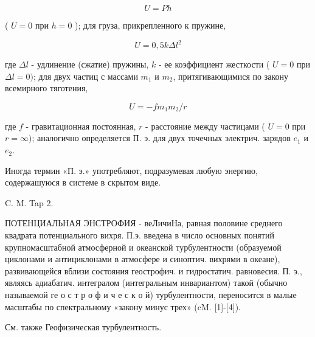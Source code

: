 \documentclass[10pt]{article}
\begin{document}
\[

U=P h

\]



( $U=0$ при $h=0$ ); для груза, прикрепленного к пружине,



\[

U=0,5 k \Delta l^{2}

\]



где $\Delta l$ - удлинение (сжатие) пружины, $k$ - ее коэффициент жесткости ( $U=0$ при $\Delta l=0)$; для двух частиц с массами $m_{1}$ и $m_{2}$, притягивающимися по закону всемирного тяготения,



\[

U=-f m_{1} m_{2} / r

\]



где $f$ - гравитационная постоянная, $r$ - расстояние между частицами ( $U=0$ при $r=\infty)$; аналогично определяется П. э. для двух точечных электрич. зарядов $e_{1}$ и $e_{2}$.



Иногда термин «П. э.» употребляют, подразумевая любую энергию, содержашуюся в системе в скрытом виде.



C. M. Tap 2.



ПОТЕНЦИАЛЬНАЯ ЭНСТРОФИЯ - веЛичиНа, равная половине среднего квадрата потенциального вихря. П.э. введена в число основных понятий крупномасштабной атмосферной и океанской турбулентности (образуемой циклонами и антициклонами в атмосфере и синоптич. вихрями в океане), развивающейся вблизи состояния геострофич. и гидростатич. равновесия. П. э., являясь адиабатич. интегралом (интегральным инвариантом) такой (обычно называемой ге о с т р о ф и ч е с к о й) турбулентности, переносится в малые масштабы по спектральному «закону минус трех» (cM. [1]-[4]).



См. также Геофизическая турбулентность.
\end{document}
